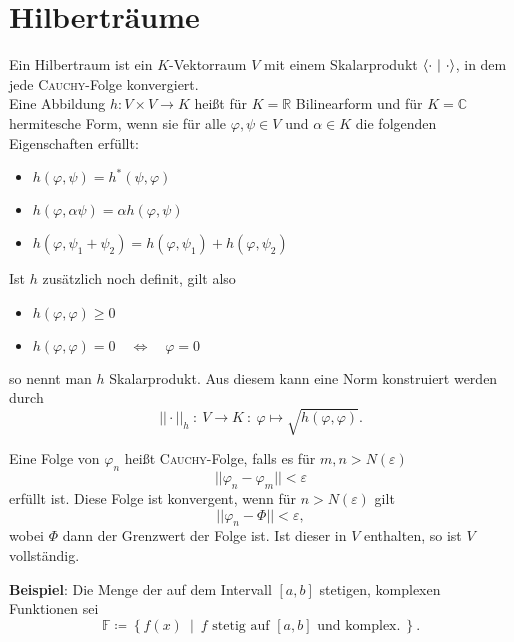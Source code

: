 \documentclass[a4paper,12pt,portrait]{book}
\numberwithin{equation}{section}
\begin{document}
\section{Hilberträume}

Ein Hilbertraum ist ein $K$-Vektorraum $V$ mit einem Skalarprodukt $\left\langle \cdot \ \middle| \ \cdot\right\rangle$, in dem jede \textsc{Cauchy}-Folge konvergiert.\\

Eine Abbildung $h:V\times V\rightarrow K$ heißt für $K=\mathbb{R}$ Bilinearform und für $K=\mathbb{C}$ hermitesche Form, wenn sie für alle $\varphi, \psi\in V$ und $\alpha\in K$ die folgenden Eigenschaften erfüllt:
	
\begin{itemize}
	\item $h(\varphi, \psi) = h^*(\psi,\varphi)$
	\item $h(\varphi, \alpha\psi) = \alpha h (\varphi,\psi)$
	\item $h(\varphi, \psi_1 + \psi_2) = h(\varphi,\psi_1)+h(\varphi,\psi_2)$
\end{itemize}

Ist $h$ zusätzlich noch definit, gilt also

\begin{itemize}
	\item $h(\varphi,\varphi)\geq 0$
	\item $h(\varphi,\varphi) = 0 \quad \Leftrightarrow \quad \varphi = 0$
\end{itemize}

so nennt man $h$ Skalarprodukt. Aus diesem kann eine Norm konstruiert werden durch
\begin{equation*}
||\cdot||_h \ :\ V\rightarrow K \ :\ \varphi \mapsto \sqrt{h(\varphi,\varphi)}.
\end{equation*}

Eine Folge von $\varphi_n$ heißt \textsc{Cauchy}-Folge, falls es für $m,n>N(\varepsilon)$
\begin{equation*}
||\varphi_n-\varphi_m|| < \varepsilon
\end{equation*}
erfüllt ist. Diese Folge ist konvergent, wenn für $n>N(\varepsilon)$ gilt
\begin{equation*}
||\varphi_n - \Phi||<\varepsilon,
\end{equation*}
wobei $\Phi$ dann der Grenzwert der Folge ist. Ist dieser in $V$ enthalten, so ist $V$ vollständig.\\ \linebreak

\textbf{Beispiel}: Die Menge der auf dem Intervall $[a,b]$ stetigen, komplexen Funktionen sei
\begin{equation*}
\mathbb{F}\coloneqq \left\lbrace f(x)\ \middle| \ f \text{ stetig auf } [a,b] \text{ und komplex.}\ \right\rbrace.
\end{equation*}
\end{document}
